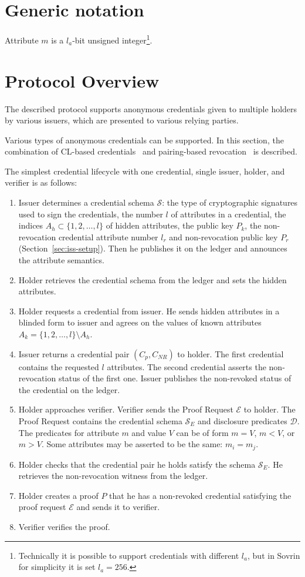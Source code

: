 \section{Generic notation}

Attribute $m$ is a $l_a$-bit unsigned integer\footnote{Technically it is possible to support credentials with different $l_a$, but in Sovrin for simplicity it is set $l_a=256$.}. 


\section{Protocol Overview}

The described protocol supports anonymous credentials given to multiple holders  by various issuers, which are presented to various relying parties.

Various types of anonymous credentials can be supported. In this section, the combination of CL-based credentials~\cite{CamenischL02} and pairing-based revocation~\cite{CamenischKS09} is described.

The simplest credential lifecycle with one credential, single issuer, holder, and verifier is as follows:
\begin{enumerate}
    \item Issuer determines a credential schema $\mathcal{S} $: the type of cryptographic signatures used to sign the credentials, the number $l$ of attributes in a credential, the indices $A_h\subset \{1,2,\ldots,l\}$ of hidden attributes, the public key $P_k$, the non-revocation credential attribute number $l_r$ and non-revocation public key $P_r$ (Section~\ref{sec:iss-setup}). Then he publishes it on the ledger and announces the attribute semantics.
    \item Holder retrieves the credential schema from the ledger and sets the hidden attributes.
    \item Holder requests a credential from issuer. He sends hidden attributes in a blinded form to issuer and agrees on the values of known attributes $A_k=\{1,2,
\ldots,l\}\setminus A_h$.
    \item Issuer returns a credential pair $(C_p, C_{NR})$ to holder. The first credential contains the requested $l$ attributes. The second credential asserts the non-revocation status of the first one. Issuer publishes the non-revoked status of the credential on the ledger.
    \item Holder approaches verifier. Verifier sends the Proof Request $\mathcal{E}$
    to holder. The Proof Request contains the credential schema $\mathcal{S}_E$ and disclosure predicates $\mathcal{D}$. The predicates for attribute $m$ and value $V$ can be of form $m=V$, $m<V$, or $m>V$. Some attributes may be asserted to be the same: $m_i=m_j$.
    \item Holder checks that the credential pair he holds satisfy the schema $\mathcal{S}_E$. 
    He retrieves the non-revocation witness from the ledger.
    \item Holder creates a proof $P$ that he has a non-revoked credential satisfying the proof request $\mathcal{E}$ and sends it to verifier.
    \item Verifier verifies the proof.
\end{enumerate}


